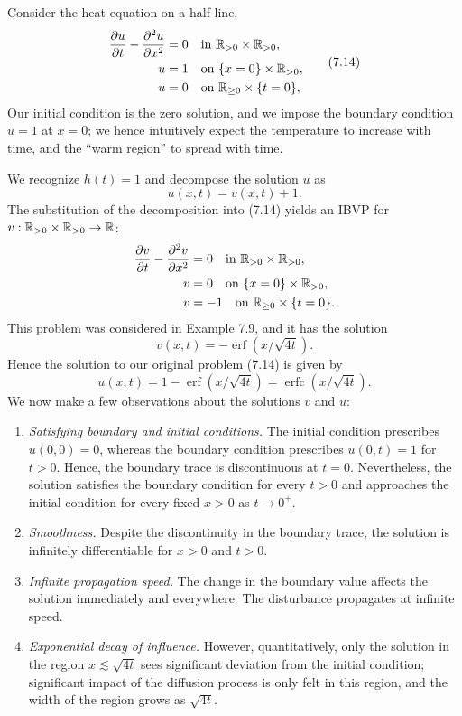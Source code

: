 \begin{example}[][7.13]
    Consider the heat equation on a half-line,
    \begin{equation*}
        \begin{aligned}
            \frac{\partial u}{\partial t} - \frac{\partial^2 u}{\partial x^2} &= 0 \quad \text{in } \mathbb{R}_{>0} \times \mathbb{R}_{>0}, \\
            u &= 1 \quad \text{on } \{x = 0\} \times \mathbb{R}_{>0}, \\
            u &= 0 \quad \text{on } \mathbb{R}_{\geq 0} \times \{t = 0\},
        \end{aligned} \tag{7.14}
    \end{equation*}
    Our initial condition is the zero solution, and we impose the boundary condition $u = 1$ at $x = 0$; we hence intuitively expect the temperature to increase with time, and the ``warm region'' to spread with time.

    We recognize $h(t) = 1$ and decompose the solution $u$ as
    \[u(x, t) = v(x, t) + 1.\]
    The substitution of the decomposition into (7.14) yields an IBVP for $v : \mathbb{R}_{>0} \times \mathbb{R}_{>0} \to \mathbb{R}$:
    \begin{align*}
        \frac{\partial v}{\partial t} - \frac{\partial^2 v}{\partial x^2} &= 0 \quad \text{in } \mathbb{R}_{>0} \times \mathbb{R}_{>0}, \\
        v &= 0 \quad \text{on } \{x = 0\} \times \mathbb{R}_{>0}, \\
        v &= -1 \quad \text{on } \mathbb{R}_{\geq 0} \times \{t = 0\}.
    \end{align*}
    This problem was considered in Example 7.9, and it has the solution
    \[v(x, t) = -\operatorname{erf}(x/\sqrt{4t}).\]
    Hence the solution to our original problem (7.14) is given by
    \[u(x, t) = 1 - \operatorname{erf}(x/\sqrt{4t}) = \operatorname{erfc}(x/\sqrt{4t}).\]
    We now make a few observations about the solutions $v$ and $u$:
    \begin{enumerate}
        \item \textit{Satisfying boundary and initial conditions.} The initial condition prescribes $u(0, 0) = 0$, whereas the boundary condition prescribes $u(0, t) = 1$ for $t > 0$. Hence, the boundary trace is discontinuous at $t = 0$. Nevertheless, the solution satisfies the boundary condition for every $t > 0$ and approaches the initial condition for every fixed $x > 0$ as $t \to 0^+$.
        \item \textit{Smoothness.} Despite the discontinuity in the boundary trace, the solution is infinitely differentiable for $x > 0$ and $t > 0$.
        \item \textit{Infinite propagation speed.} The change in the boundary value affects the solution immediately and everywhere. The disturbance propagates at infinite speed.
        \item \textit{Exponential decay of influence.} However, quantitatively, only the solution in the region $x \lesssim \sqrt{4t}$ sees significant deviation from the initial condition; significant impact of the diffusion process is only felt in this region, and the width of the region grows as $\sqrt{4t}$.
    \end{enumerate}
\end{example}

